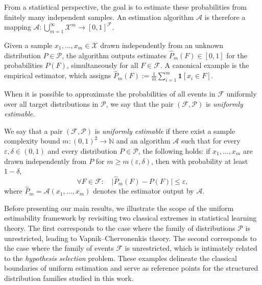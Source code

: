 \documentclass[arxiv]{colt2026}
\newcommand{\N}{\mathbb{N}}
\newcommand{\X}{\mathcal{X}}
\newcommand{\F}{\mathcal{F}}
\newcommand{\A}{\mathcal{A}}
\newcommand{\Pc}{\mathcal{P}}
\newcommand{\eps}{\varepsilon}
\begin{document}
{From a statistical perspective, the goal is to estimate these probabilities
from finitely many independent samples.}
 An estimation algorithm $\A$ is therefore a mapping
\(
\A : \bigcup_{m=1}^\infty \X^m \to [0,1]^\F.
\)

Given a sample $x_1,\ldots,x_m \in \X$ drawn independently from an unknown distribution $P \in \Pc$, the algorithm outputs estimates $\widehat P_m(F) \in [0,1]$ for the probabilities $P(F)$, simultaneously for all $F \in \F$. A canonical example is the empirical estimator, which assigns
\(\widehat P_m(F) := \frac{1}{m}\sum_{i=1}^m \mathbf{1}[x_i \in F].\)

When it is possible to approximate the probabilities of all events in $\F$ uniformly over all target distributions in $\Pc$, we say that the pair $(\F,\Pc)$ is \emph{uniformly estimable}.
\vspace{-1em}
\begin{definition}\label{def:unifest}
We say that a pair $(\F, \Pc)$ is \emph{uniformly estimable} if there exist a sample complexity bound $m : (0,1)^2 \to \N$ and an algorithm $\A$ such that for every $\eps, \delta \in (0,1)$ and every distribution $P \in \Pc$, the following holds: if $x_1, \ldots, x_m$ are drawn independently from $P$ for $m \ge m(\eps, \delta)$,
then with probability at least $1 - \delta$,
\begin{equation*}\label{eq:goal}
\forall F \in \F:\quad \bigl| \widehat P_m(F) - P(F) \bigr| \le \eps,
\end{equation*}
where $\widehat P_m = \A(x_1, \ldots, x_m)$ denotes the estimator output by $\A$.
\end{definition}

\vspace{-0.5em}
Before presenting our main results, we illustrate the scope of the uniform estimability framework by revisiting two classical extremes in statistical learning theory. The first corresponds to the case where the family of distributions $\Pc$ is unrestricted, leading to Vapnik--Chervonenkis theory. The second corresponds to the case where the family of events $\F$ is unrestricted, which is intimately related to the \emph{hypothesis selection} problem. These examples delineate the classical boundaries of uniform estimation and serve as reference points for the structured distribution families studied in this work.
\end{document}
